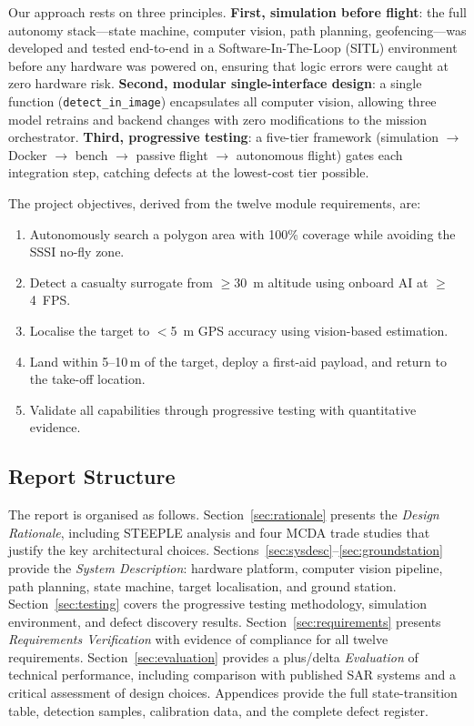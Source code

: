 Our approach rests on three principles. \textbf{First, simulation before flight}: the full autonomy stack---state machine, computer vision, path planning, geofencing---was developed and tested end-to-end in a Software-In-The-Loop (SITL) environment before any hardware was powered on, ensuring that logic errors were caught at zero hardware risk. \textbf{Second, modular single-interface design}: a single function (\texttt{detect\_in\_image}) encapsulates all computer vision, allowing three model retrains and backend changes with zero modifications to the mission orchestrator. \textbf{Third, progressive testing}: a five-tier framework (simulation $\to$ Docker $\to$ bench $\to$ passive flight $\to$ autonomous flight) gates each integration step, catching defects at the lowest-cost tier possible.

The project objectives, derived from the twelve module requirements, are:
\begin{enumerate}[nosep]
    \item Autonomously search a polygon area with 100\% coverage while avoiding the SSSI no-fly zone.
    \item Detect a casualty surrogate from $\geq$\SI{30}{\metre} altitude using onboard AI at $\geq$\SI{4}{FPS}.
    \item Localise the target to $<$\SI{5}{\metre} GPS accuracy using vision-based estimation.
    \item Land within 5--10\,m of the target, deploy a first-aid payload, and return to the take-off location.
    \item Validate all capabilities through progressive testing with quantitative evidence.
\end{enumerate}

\subsection*{Report Structure}

The report is organised as follows. Section~\ref{sec:rationale} presents the \emph{Design Rationale}, including STEEPLE analysis and four MCDA trade studies that justify the key architectural choices. Sections~\ref{sec:sysdesc}--\ref{sec:groundstation} provide the \emph{System Description}: hardware platform, computer vision pipeline, path planning, state machine, target localisation, and ground station. Section~\ref{sec:testing} covers the progressive testing methodology, simulation environment, and defect discovery results. Section~\ref{sec:requirements} presents \emph{Requirements Verification} with evidence of compliance for all twelve requirements. Section~\ref{sec:evaluation} provides a plus/delta \emph{Evaluation} of technical performance, including comparison with published SAR systems and a critical assessment of design choices. Appendices provide the full state-transition table, detection samples, calibration data, and the complete defect register.
